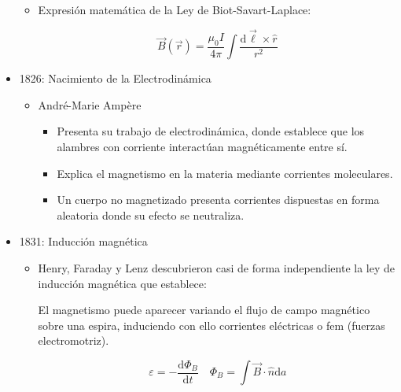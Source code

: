 \documentclass[a4paper,10pt]{article}
\begin{document}
\begin{itemize}
\begin{itemize}
    \item Expresión matemática de la Ley de Biot-Savart-Laplace:
    
    \begin{equation*}
        \vec{B}(\vec{r})=\frac{\mu_0 I}{4\pi}
        \int \frac{\mathrm{d}\vec{\ell}\times\hat{r}}{r^2}
    \end{equation*}
    
\end{itemize}

\item 1826: Nacimiento de la Electrodinámica

    \begin{itemize}
        
    \item André-Marie Ampère
    
        \begin{itemize}
            
        \item Presenta su trabajo de electrodinámica, donde establece que
        los alambres con corriente interactúan magnéticamente entre sí.

        \item Explica el magnetismo en la materia mediante corrientes
        moleculares.

        \item Un cuerpo no magnetizado presenta corrientes dispuestas en
        forma aleatoria donde su efecto se neutraliza.

        \end{itemize}
    
    \end{itemize}

\item 1831: Inducción magnética

    \begin{itemize}
    
    \item Henry, Faraday y Lenz descubrieron casi de forma independiente
    la ley de inducción magnética que establece:

    El magnetismo puede aparecer variando el flujo de campo magnético
    sobre una espira, induciendo con ello corrientes eléctricas o fem
    (fuerzas electromotriz).

    \begin{equation*}
        \varepsilon = -\frac{\mathrm{d}\Phi_B}{\mathrm{d}t}
        \quad
        \Phi_B=\int\vec{B}\cdot\hat{n}\mathrm{d}a
    \end{equation*}


\end{itemize}
\end{itemize}
\end{document}
